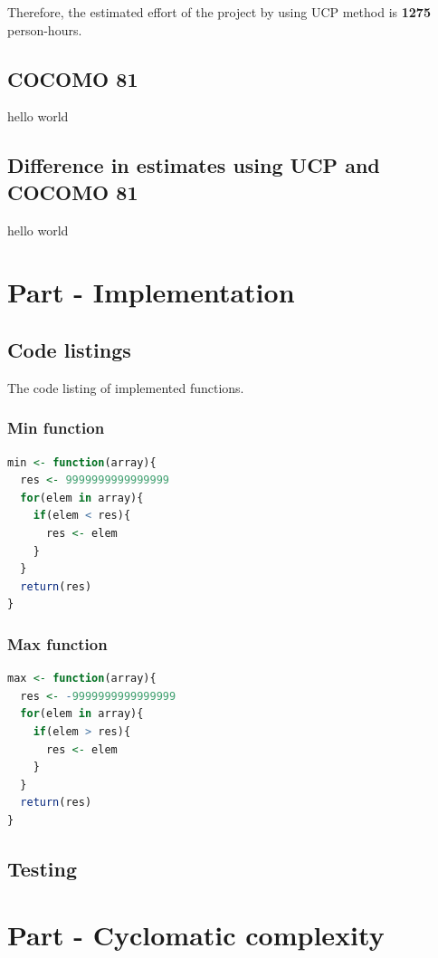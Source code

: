 \documentclass[12pt]{article}
\begin{document}
Therefore, the estimated effort of the project by using UCP method is \textbf{1275} person-hours.

\subsection{COCOMO 81}
hello world
\subsection{Difference in estimates using UCP and COCOMO 81}
hello world

\section{Part - Implementation}
\subsection{Code listings}
The code listing of implemented functions.
\subsubsection{Min function}

\begin{lstlisting}[language=R]
min <- function(array){
  res <- 9999999999999999
  for(elem in array){
    if(elem < res){
      res <- elem
    }
  }
  return(res)
}
\end{lstlisting}

\subsubsection{Max function}

\begin{lstlisting}[language=R]
max <- function(array){
  res <- -9999999999999999
  for(elem in array){
    if(elem > res){
      res <- elem
    }
  }
  return(res)
}
\end{lstlisting}
\subsection{Testing}

\section{Part - Cyclomatic complexity}
\end{document}
